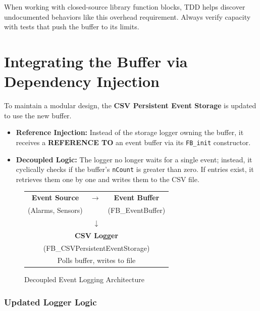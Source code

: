 \documentclass[11pt,a4paper]{article}
\begin{document}
\begin{tipbox}
When working with closed-source library function blocks, TDD helps discover undocumented behaviors like this overhead requirement. Always verify capacity with tests that push the buffer to its limits.
\end{tipbox}

\section{Integrating the Buffer via Dependency Injection}

To maintain a modular design, the \textbf{CSV Persistent Event Storage} is updated to use the new buffer.

\begin{itemize}[leftmargin=*]
    \item \textbf{Reference Injection:} Instead of the storage logger owning the buffer, it receives a \textbf{REFERENCE TO} an event buffer via its \texttt{FB\_init} constructor.
    \item \textbf{Decoupled Logic:} The logger no longer waits for a single event; instead, it cyclically checks if the buffer's \texttt{nCount} is greater than zero. If entries exist, it retrieves them one by one and writes them to the CSV file.
\end{itemize}

\begin{figure}[h]
\centering
\begin{tabular}{|c|c|c|}
\hline
\textbf{Event Source} & $\rightarrow$ & \textbf{Event Buffer} \\
(Alarms, Sensors) & & (FB\_EventBuffer) \\
\hline
\multicolumn{3}{c}{$\downarrow$} \\
\hline
\multicolumn{3}{|c|}{\textbf{CSV Logger}} \\
\multicolumn{3}{|c|}{(FB\_CSVPersistentEventStorage)} \\
\multicolumn{3}{|c|}{Polls buffer, writes to file} \\
\hline
\end{tabular}
\caption{Decoupled Event Logging Architecture}
\end{figure}

\subsubsection*{Updated Logger Logic}
\end{document}

